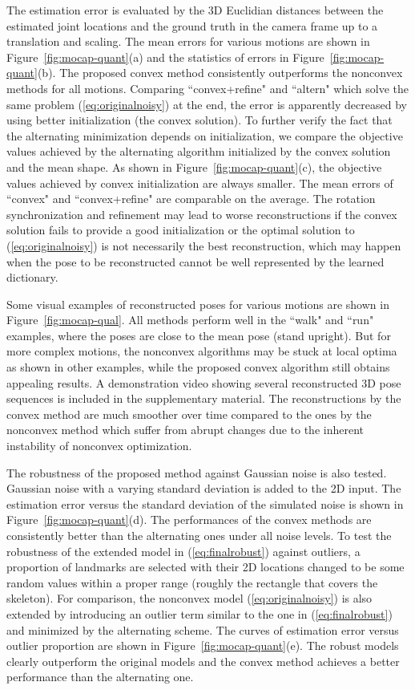 \documentclass[10pt,journal,cspaper,compsoc]{IEEEtran}
\newcommand{\refEq}[1]{(\ref{#1})}
\newcommand{\refFig}[1]{Figure~\ref{#1}}
\begin{document}
The estimation error is evaluated by the 3D Euclidian distances between the estimated joint locations and the ground truth in the camera frame up to a translation and scaling. The mean errors for various motions are shown in \refFig{fig:mocap-quant}(a) and the statistics of errors in \refFig{fig:mocap-quant}(b). The proposed convex method consistently outperforms the nonconvex methods for all motions. Comparing ``convex+refine" and ``altern" which solve the same problem \refEq{eq:originalnoisy} at the end, the error is apparently decreased by using better initialization (the convex solution). To further verify the fact that the alternating minimization depends on initialization, we compare the objective values achieved by the alternating algorithm initialized by the convex solution and the mean shape. As shown in \refFig{fig:mocap-quant}(c), the objective values achieved by convex initialization are always smaller. {The mean errors of ``convex" and ``convex+refine" are comparable on the average. The rotation synchronization and refinement may lead to worse reconstructions if the convex solution fails to provide a good initialization or the optimal solution to \refEq{eq:originalnoisy} is not necessarily the best reconstruction, which may happen when the pose to be reconstructed cannot be well represented by the learned dictionary.}




Some visual examples of reconstructed poses for various motions are shown in \refFig{fig:mocap-qual}. All methods perform well in the ``walk" and ``run" examples, where the poses are close to the mean pose (stand upright). But for more complex motions, the nonconvex algorithms may be stuck at local optima as shown in other examples, while the proposed convex algorithm still obtains appealing results. A demonstration video showing several reconstructed 3D pose sequences is included in the supplementary material. The reconstructions by the convex method are much smoother over time compared to the ones by the nonconvex method which suffer from abrupt changes due to the inherent instability of nonconvex optimization.

The robustness of the proposed method against Gaussian noise is also tested. Gaussian noise with a varying standard deviation is added to the 2D input. The estimation error versus the standard deviation of the simulated noise is shown in \refFig{fig:mocap-quant}(d). The performances of the convex methods are consistently better than the alternating ones under all noise levels. To test the robustness of the extended model in \refEq{eq:finalrobust} against outliers, a proportion of landmarks are selected with their 2D locations changed to be some random values within a proper range (roughly the rectangle that covers the skeleton). For comparison, the nonconvex model \refEq{eq:originalnoisy} is also extended by introducing an outlier term similar to the one in \refEq{eq:finalrobust} and minimized by the alternating scheme. The curves of estimation error versus outlier proportion are shown in \refFig{fig:mocap-quant}(e). The robust models clearly outperform the original models and the convex method achieves a better performance than the alternating one.
\end{document}
